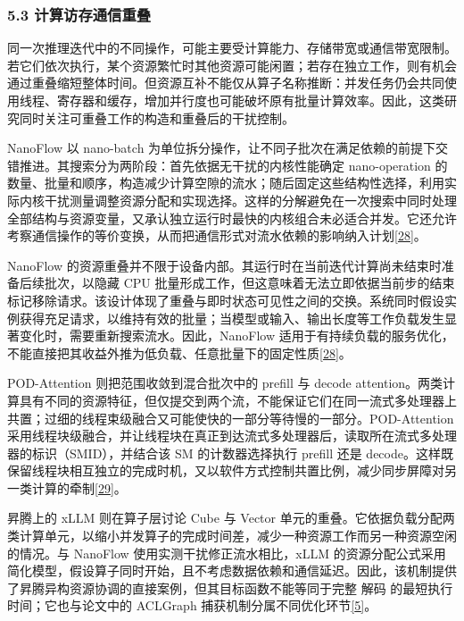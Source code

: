 \documentclass[UTF8,11pt,fontset=windows]{ctexart}
\begin{document}
\hypertarget{section-5-3}{%
\subsubsection{\texorpdfstring{\textbf{5.3 计算访存通信重叠}}{5.3 计算访存通信重叠}}\label{section-5-3}}

同一次推理迭代中的不同操作，可能主要受计算能力、存储带宽或通信带宽限制。若它们依次执行，某个资源繁忙时其他资源可能闲置；若存在独立工作，则有机会通过重叠缩短整体时间。但资源互补不能仅从算子名称推断：并发任务仍会共同使用线程、寄存器和缓存，增加并行度也可能破坏原有批量计算效率。因此，这类研究同时关注可重叠工作的构造和重叠后的干扰控制。

NanoFlow 以 nano-batch 为单位拆分操作，让不同子批次在满足依赖的前提下交错推进。其搜索分为两阶段：首先依据无干扰的内核性能确定 nano-operation 的数量、批量和顺序，构造减少计算空隙的流水；随后固定这些结构性选择，利用实际内核干扰测量调整资源分配和实现选择。这样的分解避免在一次搜索中同时处理全部结构与资源变量，又承认独立运行时最快的内核组合未必适合并发。它还允许考察通信操作的等价变换，从而把通信形式对流水依赖的影响纳入计划\protect\hyperlink{ref-28}{{[}28{]}}。

NanoFlow 的资源重叠并不限于设备内部。其运行时在当前迭代计算尚未结束时准备后续批次，以隐藏 CPU 批量形成工作，但这意味着无法立即依据当前步的结束标记移除请求。该设计体现了重叠与即时状态可见性之间的交换。系统同时假设实例获得充足请求，以维持有效的批量；当模型或输入、输出长度等工作负载发生显著变化时，需要重新搜索流水。因此，NanoFlow 适用于有持续负载的服务优化，不能直接把其收益外推为低负载、任意批量下的固定性质\protect\hyperlink{ref-28}{{[}28{]}}。

POD-Attention 则把范围收敛到混合批次中的 prefill 与 decode attention。两类计算具有不同的资源特征，但仅提交到两个流，不能保证它们在同一流式多处理器上共置；过细的线程束级融合又可能使快的一部分等待慢的一部分。POD-Attention 采用线程块级融合，并让线程块在真正到达流式多处理器后，读取所在流式多处理器的标识（SMID），并结合该 SM 的计数器选择执行 prefill 还是 decode。这样既保留线程块相互独立的完成时机，又以软件方式控制共置比例，减少同步屏障对另一类计算的牵制\protect\hyperlink{ref-29}{{[}29{]}}。

昇腾上的 xLLM 则在算子层讨论 Cube 与 Vector 单元的重叠。它依据负载分配两类计算单元，以缩小并发算子的完成时间差，减少一种资源工作而另一种资源空闲的情况。与 NanoFlow 使用实测干扰修正流水相比，xLLM 的资源分配公式采用简化模型，假设算子同时开始，且不考虑数据依赖和通信延迟。因此，该机制提供了昇腾异构资源协调的直接案例，但其目标函数不能等同于完整 解码 的最短执行时间；它也与论文中的 ACLGraph 捕获机制分属不同优化环节\protect\hyperlink{ref-5}{{[}5{]}}。
\end{document}
